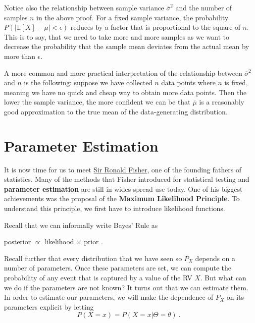 Notice also the relationship between sample variance $ \overline{\sigma}^{2} $ and the number of samples $ n $ in the above proof. For a fixed sample variance, the
probability $ P(|\mathbb{E}[X] - \overline{\mu}| < \epsilon) $ reduces by a factor that is proportional to the square of $ n $. This is to say, that we need to take
more and more samples as we want to decrease the probability that the sample mean deviates from the actual mean by more than $ \epsilon $. 

A more common and more practical interpretation of the relationship between $ \overline{\sigma}^{2} $ and $ n $ is the following: suppose we have collected $ n $ data
points where $ n $ is fixed, meaning we have no quick and cheap way to obtain more data points. Then the lower the sample variance, the more confident we can be
that $ \overline{\mu} $ is a reasonably good approximation to the true mean of the data-generating distribution.



\section{Parameter Estimation}

It is now time for us to meet \href{https://en.wikipedia.org/wiki/Ronald_Fisher}{Sir Ronald Fisher}, 
one of the founding fathers of statistics. Many of the methods that Fisher introduced
for statistical testing and \textbf{parameter estimation} are still in wides-spread use today. One of his biggest achievements was the proposal of the 
\textbf{Maximum Likelihood Principle}. To understand this principle, we first have to introduce likelihood functions.

Recall that we can informally write Bayes' Rule as 
\begin{center}
posterior $ \propto $ likelihood $ \times $ prior .
\end{center}
Recall further that every distribution that we have seen so $ P_{X} $ depends on a number of parameters. Once these parameters are set, we can compute the probability of 
any event that is  captured by a value of the RV $ X $. But what can we do if the parameters are not known? It turns out that we can estimate them. In order to 
estimate our parameters, we will make the dependence of $ P_{X} $ on its parameters explicit by letting
\begin{equation}
P(X=x) = P(X=x|\Theta = \theta) \ . 
\end{equation}


